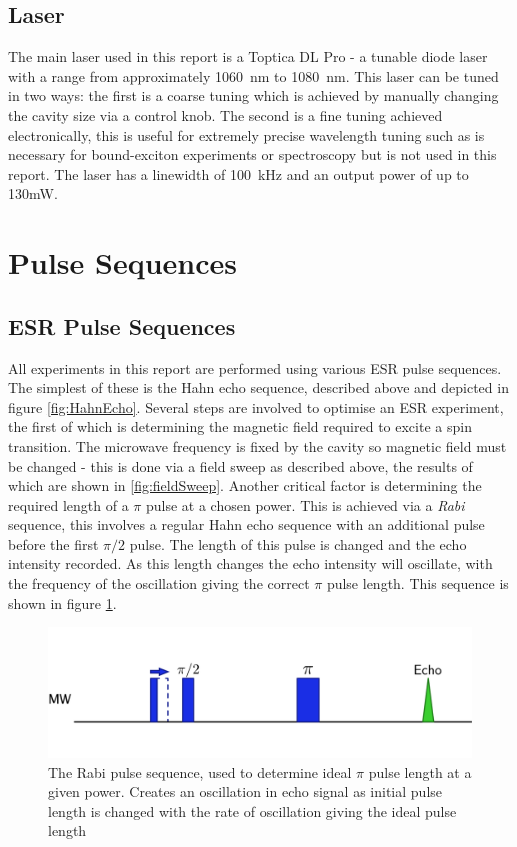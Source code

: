 \subsection{Laser}

The main laser used in this report is a Toptica DL Pro - a tunable diode laser with a range from approximately 1060~nm to 1080~nm.
This laser can be tuned in two ways: the first is a coarse tuning which is achieved by manually changing the cavity size via a control knob. 
The second is a fine tuning achieved electronically, this is useful for extremely precise wavelength tuning such as is necessary for bound-exciton experiments or spectroscopy but is not used in this report.
The laser has a linewidth of 100~kHz and an output power of up to 130mW.

\section{Pulse Sequences}


\subsection{ESR Pulse Sequences}

All experiments in this report are performed using various ESR pulse sequences. 
The simplest of these is the Hahn echo sequence, described above and depicted in figure \ref{fig:HahnEcho}.
Several steps are involved to optimise an ESR experiment, the first of which is determining the magnetic field required to excite a spin transition. 
The microwave frequency is fixed by the cavity so magnetic field must be changed - this is done via a field sweep as described above, the results of which are shown in \ref{fig:fieldSweep}. 
Another critical factor is determining the required length of a $\pi$ pulse at a chosen power.
This is achieved via a \emph{Rabi} sequence, this involves a regular Hahn echo sequence with an additional pulse before the first $\pi/2$ pulse. 
The length of this pulse is changed and the echo intensity recorded. 
As this length changes the echo intensity will oscillate, with the frequency of the oscillation giving the correct $\pi$ pulse length.
This sequence is shown in figure \ref{fig:Rabi}.

\begin{figure}
\centering
\includegraphics[width = \columnwidth]{Figures/Rabi.pdf}
\caption[Rabi Sequence]{The Rabi pulse sequence, used to determine ideal $\pi$ pulse length at a given power. Creates an oscillation in echo signal as initial pulse length is changed with the rate of oscillation giving the ideal pulse length}
\label{fig:Rabi}
\end{figure}

